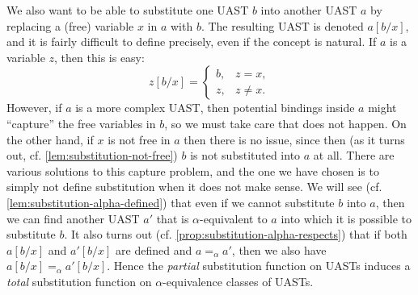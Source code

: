 \documentclass[a4paper, 11pt, article, danish, oneside]{memoir}
\begin{document}
We also want to be able to substitute one UAST $b$ into another UAST $a$ by replacing a (free) variable $x$ in $a$ with $b$. The resulting UAST is denoted $a[b/x]$, and it is fairly difficult to define precisely, even if the concept is natural. If $a$ is a variable $z$, then this is easy:
%
\begin{equation*}
    z[b/x]
        = \begin{cases}
            b, & z = x, \\
            z, & z \neq x.
        \end{cases}
\end{equation*}
%
However, if $a$ is a more complex UAST, then potential bindings inside $a$ might \enquote{capture} the free variables in $b$, so we must take care that does not happen. On the other hand, if $x$ is not free in $a$ then there is no issue, since then (as it turns out, cf. \cref{lem:substitution-not-free}) $b$ is not substituted into $a$ at all. There are various solutions to this capture problem, and the one we have chosen is to simply not define substitution when it does not make sense. We will see (cf. \cref{lem:substitution-alpha-defined}) that even if we cannot substitute $b$ into $a$, then we can find another UAST $a'$ that is $\alpha$-equivalent to $a$ into which it is possible to substitute $b$. It also turns out (cf. \cref{prop:substitution-alpha-respects}) that if both $a[b/x]$ and $a'[b/x]$ are defined and $a =_\alpha a'$, then we also have $a[b/x] =_\alpha a'[b/x]$. Hence the \emph{partial} substitution function on UASTs induces a \emph{total} substitution function on $\alpha$-equivalence classes of UASTs.
\end{document}
